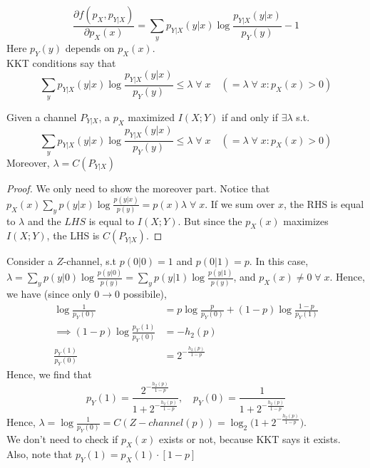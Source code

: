 \[\frac{\partial f(p_X, p_{Y|X})}{\partial p_X(x)} = \sum_y p_{Y|X}(y|x) \log \frac{p_{Y|X} (y|x)}{p_Y(y)} - 1\]
Here $p_Y(y)$ depends on $p_X(x)$. \\
KKT conditions say that 
\[\sum_y p_{Y|X}(y|x)\log \frac{p_{Y|X} (y|x)}{p_Y(y)} \leq \lambda \;\forall\;x \quad (= \lambda \;\forall\;x:p_X(x) > 0)\]
\begin{theorem}
    Given a channel $P_{Y|X}$, a $p_X$ maximized $I(X;Y)$ if and only if $\exists \lambda$ s.t.
    \[\sum_y p_{Y|X}(y|x)\log \frac{p_{Y|X} (y|x)}{p_Y(y)} \leq \lambda \;\forall\;x \quad (= \lambda \;\forall\;x:p_X(x) > 0)\]
    Moreover, $\lambda = C(P_{Y|X})$
\end{theorem}
\begin{proof}
We only need to show the moreover part. Notice that $p_X(x) \sum_y p(y|x) \log\frac{p(y|x)}{p(y)} = p(x) \lambda \;\forall\;x$. If we sum over $x$, the RHS is equal to $\lambda$ and the $LHS$ is equal to $I(X;Y)$. But since the $p_X(x)$ maximizes $I(X;Y)$, the LHS is $C(P_{Y|X})$.
\end{proof}
\begin{eg}
Consider a $Z$-channel, s.t $p(0|0) = 1$ and $p(0|1) = p$. In this case, \\ $\lambda = \sum_y p(y|0) \log\frac{p(y|0)}{p(y)} = \sum_y p(y|1) \log\frac{p(y|1)}{p(y)}$, and $p_X(x) \neq 0 \; \forall \;x$. Hence, we have (since only $0\to0$ possibile),
\begin{align*}
\log \frac{1}{p_Y(0)} &= p \log \frac{p}{p_Y(0)} + (1-p) \log \frac{1-p}{p_Y(1)} \\
\implies (1-p) \log \frac{p_Y(1)}{p_Y(0)} &= -h_2(p) \\
\frac{p_Y(1)}{p_Y(0)} &= 2^{-\frac{h_2(p)}{1-p}}
\end{align*}
Hence, we find that
\[p_Y(1) = \frac{2^{-\frac{h_2(p)}{1-p}}}{1 + 2^{-\frac{h_2(p)}{1-p}}}, \quad p_Y(0) = \frac{1}{1 + 2^{-\frac{h_2(p)}{1-p}}}\]
Hence, $\lambda = \log \frac{1}{p_Y(0)} = C(Z-channel(p)) = \log_2 \bigg(1 + 2^{-\frac{h_2(p)}{1-p}}\bigg)$. \\
We don't need to check if $p_X(x)$ exists or not, because KKT says it exists. Also, note that $p_Y(1) = p_X(1) \cdot [1-p]$
\end{eg}
